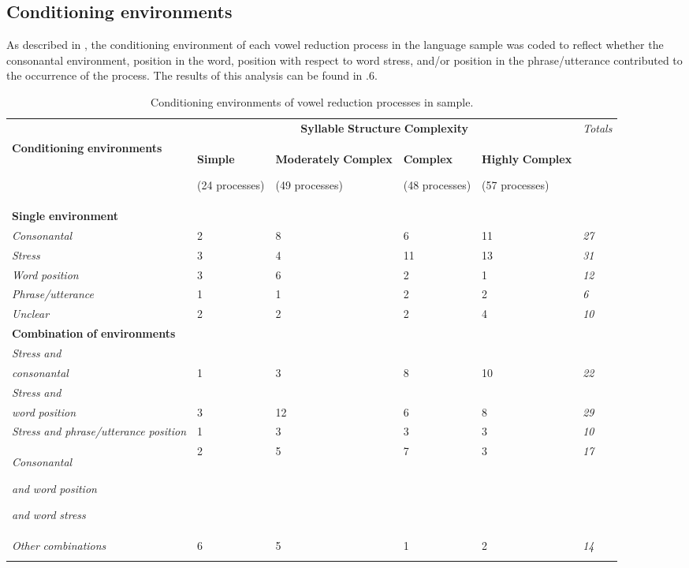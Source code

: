 \subsection{Conditioning environments}\label{sec:6.3.4}

  As described in , the conditioning environment of each vowel reduction process in the language sample was coded to reflect whether the consonantal environment, position in the word, position with respect to word stress, and/or position in the phrase/utterance contributed to the occurrence of the process. The results of this analysis can be found in .6.

\begin{table}
\begin{tabularx}{\textwidth}{XXXXXX}
\lsptoprule
 & \multicolumn{4}{c}{ \textbf{Syllable} \textbf{Structure} \textbf{Complexity}} & \textit{Totals}\\
 \textbf{Conditioning} \textbf{environments} & { \textbf{Simple}}

 (24 processes) & { \textbf{Moderately} \textbf{Complex}}

 (49 processes) & { \textbf{Complex}}

 (48 processes) & { \textbf{Highly} \textbf{Complex}}

 (57 processes) & \\
 \textbf{Single} \textbf{environment} & \multicolumn{5}{c}{}\\
 \textit{Consonantal} & 2 & 8 & 6 & 11 & \textit{27}\\
 \textit{Stress} & 3 & 4 & 11 & 13 & \textit{31}\\
 \textit{Word} \textit{position} & 3 & 6 & 2 & 1 & \textit{12}\\
 \textit{Phrase/utterance} & 1 & 1 & 2 & 2 & \textit{6}\\
 \textit{Unclear} & 2 & 2 & 2 & 4 & \textit{10}\\
 \textbf{Combination} \textbf{of} \textbf{environments} & \multicolumn{5}{c}{}\\
 \textit{Stress} \textit{and} \\
\textit{consonantal} & 1 & 3 & 8 & 10 & \textit{22}\\
 \textit{Stress} \textit{and} \\
\textit{word} \textit{position} & 3 & 12 & 6 & 8 & \textit{29}\\
 \textit{Stress} \textit{and} \textit{phrase/utterance} \textit{position} & 1 & 3 & 3 & 3 & \textit{10}\\
{ \textit{Consonantal} }

{ \textit{and} \textit{word} \textit{position} }

 \textit{and} \textit{word} \textit{stress} & 2 & 5 & 7 & 3 & \textit{17}\\
 \textit{Other} \textit{combinations} & 6 & 5 & 1 & 2 & \textit{14}\\
\lspbottomrule
\end{tabularx}
\caption{\label{6.6}Conditioning environments of vowel reduction processes in sample.}
\end{table}

